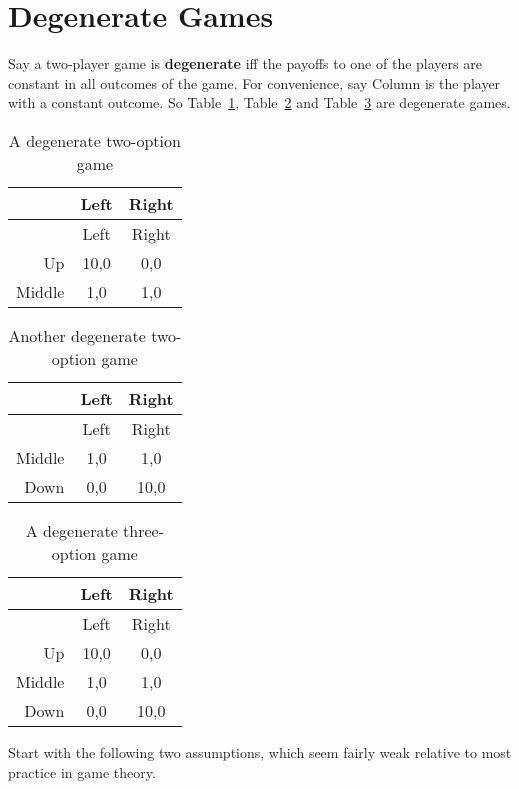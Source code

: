 \documentclass[
  11pt,
  letterpaper,
  DIV=11,
  numbers=noendperiod,
  twoside]{scrartcl}
\begin{document}
\section{Degenerate Games}\label{sec-games}

Say a two-player game is \textbf{degenerate} iff the payoffs to one of
the players are constant in all outcomes of the game. For convenience,
say Column is the player with a constant outcome. So
Table~\ref{tbl-upmid}, Table~\ref{tbl-middown} and
Table~\ref{tbl-allthree} are degenerate games.

\begin{longtable}[]{@{}rcc@{}}
\caption{A degenerate two-option game}\label{tbl-upmid}\tabularnewline
\toprule\noalign{}
& Left & Right \\
\midrule\noalign{}
\endfirsthead
\toprule\noalign{}
& Left & Right \\
\midrule\noalign{}
\endhead
\bottomrule\noalign{}
\endlastfoot
Up & 10,0 & 0,0 \\
Middle & 1,0 & 1,0 \\
\end{longtable}

\begin{longtable}[]{@{}rcc@{}}
\caption{Another degenerate two-option
game}\label{tbl-middown}\tabularnewline
\toprule\noalign{}
& Left & Right \\
\midrule\noalign{}
\endfirsthead
\toprule\noalign{}
& Left & Right \\
\midrule\noalign{}
\endhead
\bottomrule\noalign{}
\endlastfoot
Middle & 1,0 & 1,0 \\
Down & 0,0 & 10,0 \\
\end{longtable}

\begin{longtable}[]{@{}rcc@{}}
\caption{A degenerate three-option
game}\label{tbl-allthree}\tabularnewline
\toprule\noalign{}
& Left & Right \\
\midrule\noalign{}
\endfirsthead
\toprule\noalign{}
& Left & Right \\
\midrule\noalign{}
\endhead
\bottomrule\noalign{}
\endlastfoot
Up & 10,0 & 0,0 \\
Middle & 1,0 & 1,0 \\
Down & 0,0 & 10,0 \\
\end{longtable}

Start with the following two assumptions, which seem fairly weak
relative to most practice in game theory.
\end{document}

